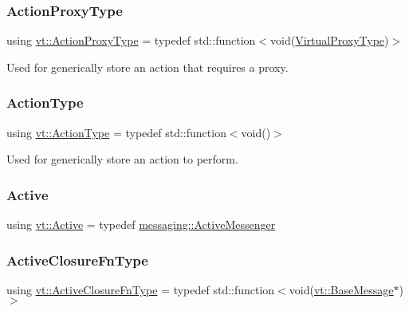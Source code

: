 \subsubsection{\texorpdfstring{Action\+Proxy\+Type}{ActionProxyType}}
{\footnotesize\ttfamily using \hyperlink{namespacevt_a102aa105d64254d89f7e585d106c95aa}{vt\+::\+Action\+Proxy\+Type} = typedef std\+::function$<$void(\hyperlink{namespacevt_a1b417dd5d684f045bb58a0ede70045ac}{Virtual\+Proxy\+Type})$>$}



Used for generically store an action that requires a proxy. 

\mbox{\label{namespacevt_ae0a5a7b18cc99d7b732cb4d44f46b0f3}} 
\subsubsection{\texorpdfstring{Action\+Type}{ActionType}}
{\footnotesize\ttfamily using \hyperlink{namespacevt_ae0a5a7b18cc99d7b732cb4d44f46b0f3}{vt\+::\+Action\+Type} = typedef std\+::function$<$void()$>$}



Used for generically store an action to perform. 

\mbox{\label{namespacevt_ad548cc368cddb926753ac237eb454dae}} 
\subsubsection{\texorpdfstring{Active}{Active}}
{\footnotesize\ttfamily using \hyperlink{namespacevt_ad548cc368cddb926753ac237eb454dae}{vt\+::\+Active} = typedef \hyperlink{structvt_1_1messaging_1_1_active_messenger}{messaging\+::\+Active\+Messenger}}

\mbox{\label{namespacevt_a2a06c34cafcd511828f16cbf1476b924}} 
\subsubsection{\texorpdfstring{Active\+Closure\+Fn\+Type}{ActiveClosureFnType}}
{\footnotesize\ttfamily using \hyperlink{namespacevt_a2a06c34cafcd511828f16cbf1476b924}{vt\+::\+Active\+Closure\+Fn\+Type} = typedef std\+::function$<$void(\hyperlink{namespacevt_ac34f95a5e2b8109b55bfba52b074443d}{vt\+::\+Base\+Message}$\ast$)$>$}

